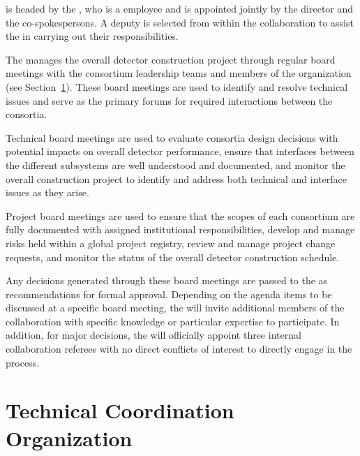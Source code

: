  is headed by the , who is a 
employee and is appointed jointly by the  director 
and the  co-spokespersons.  A deputy  
is selected from within the collaboration to assist the 
 in carrying out their responsibilities.

The  manages the overall detector construction project
through regular board meetings with the consortium leadership teams 
and members of the  organization (see Section~\ref{sec:tco}).  
These board meetings are used to identify and resolve technical issues
and serve as the primary forums for required interactions between the 
consortia.

Technical board meetings are used to evaluate consortia design
decisions with potential impacts on overall detector performance,
ensure that interfaces between the different subsystems are well
understood and documented, and monitor the overall construction
project to identify and address both technical and interface 
issues as they arise.

Project board meetings are used to ensure that the scopes of 
each consortium are fully documented with assigned institutional
responsibilities, develop and manage risks held within a global
project registry, review and manage project change requests, and
monitor the status of the overall detector construction schedule.

Any decisions generated through these board meetings are passed to 
the   as recommendations for formal approval.
Depending on the agenda items to be discussed at a specific board 
meeting, the  will invite additional members of the 
collaboration with specific knowledge or particular expertise to 
participate.  In addition, for major decisions, the  
will officially appoint three internal collaboration referees with 
no direct conflicts of interest to directly engage in the process.

\section{Technical Coordination Organization}
\label{sec:tco}

